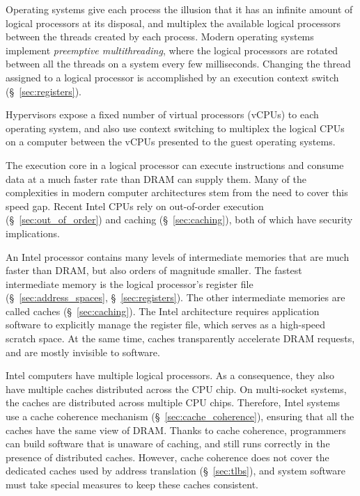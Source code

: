 Operating systems give each process the illusion that it has an infinite amount
of logical processors at its disposal, and multiplex the available logical
processors between the threads created by each process.  Modern operating
systems implement \textit{preemptive multithreading}, where the logical
processors are rotated between all the threads on a system every few
milliseconds. Changing the thread assigned to a logical processor is
accomplished by an execution context switch (\S~\ref{sec:registers}).

Hypervisors expose a fixed number of virtual processors (vCPUs) to each
operating system, and also use context switching to multiplex the logical CPUs
on a computer between the vCPUs presented to the guest operating systems.

The execution core in a logical processor can execute instructions and consume
data at a much faster rate than DRAM can supply them. Many of the complexities
in modern computer architectures stem from the need to cover this speed gap.
Recent Intel CPUs rely on out-of-order execution (\S~\ref{sec:out_of_order})
and caching (\S~\ref{sec:caching}), both of which have security implications.

An Intel processor contains many levels of intermediate memories that are much
faster than DRAM, but also orders of magnitude smaller.  The fastest
intermediate memory is the logical processor's register file
(\S~\ref{sec:address_spaces}, \S~\ref{sec:registers}). The other intermediate
memories are called caches (\S~\ref{sec:caching}). The Intel architecture
requires application software to explicitly manage the register file, which
serves as a high-speed scratch space. At the same time, caches transparently
accelerate DRAM requests, and are mostly invisible to software.

Intel computers have multiple logical processors. As a consequence, they also
have multiple caches distributed across the CPU chip. On multi-socket systems,
the caches are distributed across multiple CPU chips. Therefore, Intel systems
use a cache coherence mechanism (\S~\ref{sec:cache_coherence}), ensuring that
all the caches have the same view of DRAM. Thanks to cache coherence,
programmers can build software that is unaware of caching, and still runs
correctly in the presence of distributed caches. However, cache coherence does
not cover the dedicated caches used by address translation (\S~\ref{sec:tlbs}),
and system software must take special measures to keep these caches consistent.


